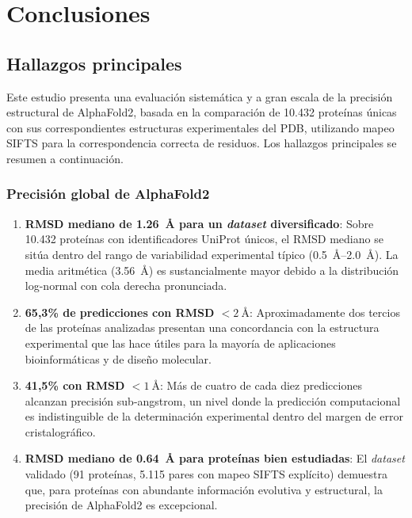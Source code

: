 
\section{Conclusiones}
\label{sec:conclusiones}

\subsection{Hallazgos principales}
\label{subsec:hallazgos_principales}

Este estudio presenta una evaluaci\'on sistem\'atica y a gran escala de la precisi\'on
estructural de AlphaFold2, basada en la comparaci\'on de 10.432 prote\'inas \'unicas
con sus correspondientes estructuras experimentales del PDB, utilizando mapeo SIFTS
para la correspondencia correcta de residuos. Los hallazgos principales se resumen
a continuaci\'on.

\subsubsection{Precisi\'on global de AlphaFold2}

\begin{enumerate}
    \item \textbf{RMSD mediano de \SI{1,26}{\angstrom} para un \textit{dataset} diversificado}:
    Sobre 10.432 prote\'inas con identificadores UniProt \'unicos, el RMSD mediano se
    sit\'ua dentro del rango de variabilidad experimental t\'ipico
    (\SIrange{0,5}{2,0}{\angstrom}). La media aritm\'etica (\SI{3,56}{\angstrom}) es
    sustancialmente mayor debido a la distribuci\'on log-normal con cola derecha
    pronunciada.

    \item \textbf{65,3\% de predicciones con RMSD $< \SI{2}{\angstrom}$}: Aproximadamente
    dos tercios de las prote\'inas analizadas presentan una concordancia con la estructura
    experimental que las hace \'utiles para la mayor\'ia de aplicaciones
    bioinform\'aticas y de dise\~no molecular.

    \item \textbf{41,5\% con RMSD $< \SI{1}{\angstrom}$}: M\'as de cuatro de cada diez
    predicciones alcanzan precisi\'on sub-angstrom, un nivel donde la predicci\'on
    computacional es indistinguible de la determinaci\'on experimental dentro del
    margen de error cristalográfico.

    \item \textbf{RMSD mediano de \SI{0,64}{\angstrom} para prote\'inas bien estudiadas}:
    El \textit{dataset} validado (91 prote\'inas, 5.115 pares con mapeo SIFTS expl\'icito) demuestra
    que, para prote\'inas con abundante informaci\'on evolutiva y estructural, la
    precisi\'on de AlphaFold2 es excepcional.
\end{enumerate}


